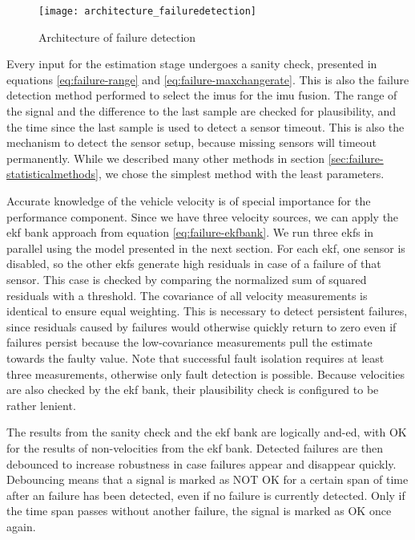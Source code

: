 \begin{figure}
	\centering
	\texttt{[image: architecture\_failuredetection]}%
	\caption{Architecture of failure detection}
	\label{fig:architecture-failuredetection}
\end{figure}

Every input for the estimation stage undergoes a sanity check, presented in equations \ref{eq:failure-range} and \ref{eq:failure-maxchangerate}. This is also the failure detection method performed to select the \glspl{imu} for the \gls{imu} fusion. The range of the signal and the difference to the last sample are checked for plausibility, and the time since the last sample is used to detect a sensor timeout. This is also the mechanism to detect the sensor setup, because missing sensors will timeout permanently. While we described many other methods in section \ref{sec:failure-statisticalmethods}, we chose the simplest method with the least parameters.

Accurate knowledge of the vehicle velocity is of special importance for the performance component. Since we have three velocity sources, we can apply the \gls{ekf} bank approach from equation \ref{eq:failure-ekfbank}. We run three \glspl{ekf} in parallel using the model presented in the next section. For each \gls{ekf}, one sensor is disabled, so the other \glspl{ekf} generate high residuals in case of a failure of that sensor. This case is checked by comparing the normalized sum of squared residuals with a threshold. The covariance of all velocity measurements is identical to ensure equal weighting. This is necessary to detect persistent failures, since residuals caused by failures would otherwise quickly return to zero even if failures persist because the low-covariance measurements pull the estimate towards the faulty value. Note that successful fault isolation requires at least three measurements, otherwise only fault detection is possible. Because velocities are also checked by the \gls{ekf} bank, their plausibility check is configured to be rather lenient.

The results from the sanity check and the \gls{ekf} bank are logically and-ed, with OK for the results of non-velocities from the \gls{ekf} bank. Detected failures are then debounced to increase robustness in case failures appear and disappear quickly. Debouncing means that a signal is marked as NOT OK for a certain span of time after an failure has been detected, even if no failure is currently detected. Only if the time span passes without another failure, the signal is marked as OK once again.

